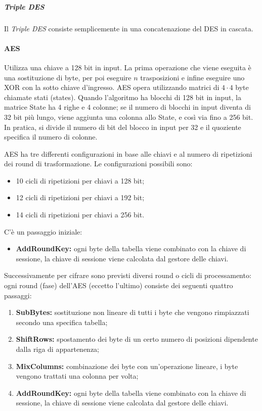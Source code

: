 \subparagraph*{Triple DES}

Il \textit{Triple DES} consiste semplicemente in una concatenazione del DES in 
cascata.

\paragraph{AES}

Utilizza una chiave a 128 bit in input. La prima operazione che viene eseguita è 
una sostituzione di byte, per poi eseguire $n$ trasposizioni e infine eseguire
uno XOR con la sotto chiave d'ingresso.
AES opera utilizzando matrici di $4\cdot4$ byte chiamate stati (states). Quando l'algoritmo ha blocchi di 128 bit in input, la matrice State ha 4 righe e 4 colonne; se il numero di blocchi in input diventa di 32 bit più lungo, viene aggiunta una colonna allo State, e così via fino a 256 bit. In pratica, si divide il numero di bit del blocco in input per 32 e il quoziente specifica il numero di colonne.

AES ha tre differenti configurazioni in base alle chiavi e al numero di 
ripetizioni dei round di trasformazione. Le configurazioni possibili sono:
\begin{itemize}
 \item 10 cicli di ripetizioni per chiavi a 128 bit;
 \item 12 cicli di ripetizioni per chiavi a 192 bit;
 \item 14 cicli di ripetizioni per chiavi a 256 bit.
\end{itemize}


C'è un passaggio iniziale:
\begin{itemize}
\item \textbf{AddRoundKey:} ogni byte della tabella viene combinato con la chiave di sessione, la chiave di sessione viene calcolata dal gestore delle chiavi.
\end{itemize}


Successivamente per cifrare sono previsti diversi round o cicli di processamento: ogni round (fase) dell'AES (eccetto l'ultimo) consiste dei seguenti quattro passaggi:

\begin{enumerate}
\item \textbf{SubBytes:} sostituzione non lineare di tutti i byte che vengono rimpiazzati secondo una specifica tabella;
\item \textbf{ShiftRows:} spostamento dei byte di un certo numero di posizioni dipendente dalla riga di appartenenza;
\item \textbf{MixColumns:} combinazione dei byte con un'operazione lineare, i byte vengono trattati una colonna per volta;
\item \textbf{AddRoundKey:} ogni byte della tabella viene combinato con la chiave di sessione, la chiave di sessione viene calcolata dal gestore delle chiavi.
\end{enumerate}

